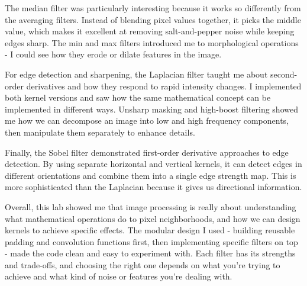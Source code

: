\documentclass[12pt,a4paper]{report}
\begin{document}
The median filter was particularly interesting because it works so differently from the averaging filters. Instead of blending pixel values together, it picks the middle value, which makes it excellent at removing salt-and-pepper noise while keeping edges sharp. The min and max filters introduced me to morphological operations - I could see how they erode or dilate features in the image.

For edge detection and sharpening, the Laplacian filter taught me about second-order derivatives and how they respond to rapid intensity changes. I implemented both kernel versions and saw how the same mathematical concept can be implemented in different ways. Unsharp masking and high-boost filtering showed me how we can decompose an image into low and high frequency components, then manipulate them separately to enhance details.

Finally, the Sobel filter demonstrated first-order derivative approaches to edge detection. By using separate horizontal and vertical kernels, it can detect edges in different orientations and combine them into a single edge strength map. This is more sophisticated than the Laplacian because it gives us directional information.

Overall, this lab showed me that image processing is really about understanding what mathematical operations do to pixel neighborhoods, and how we can design kernels to achieve specific effects. The modular design I used - building reusable padding and convolution functions first, then implementing specific filters on top - made the code clean and easy to experiment with. Each filter has its strengths and trade-offs, and choosing the right one depends on what you're trying to achieve and what kind of noise or features you're dealing with.
\end{document}
